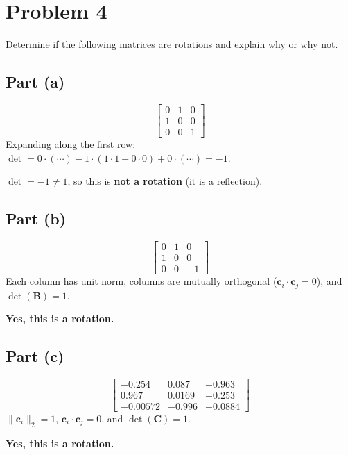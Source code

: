 \documentclass[11pt]{article}
\begin{document}
\section*{Problem 4}

\begin{statement}
Determine if the following matrices are rotations and explain why or why not.
\end{statement}

\subsection*{Part (a)}
\[
    \begin{bmatrix}
        0 & 1 & 0 \\
        1 & 0 & 0 \\
        0 & 0 & 1
    \end{bmatrix}
\]
Expanding along the first row: $\det = 0\cdot(\cdots) - 1\cdot(1\cdot1-0\cdot0) + 0\cdot(\cdots) = -1$.
\begin{result}
$\det=-1\neq1$, so this is \textbf{not a rotation} (it is a reflection).
\end{result}

\subsection*{Part (b)}
\[
    \begin{bmatrix}
        0 & 1 & 0 \\
        1 & 0 & 0 \\
        0 & 0 & -1
    \end{bmatrix}
\]
Each column has unit norm, columns are mutually orthogonal ($\bm c_i\cdot\bm c_j=0$), and $\det(\bm B)=1$.
\begin{result}
\textbf{Yes, this is a rotation.}
\end{result}

\subsection*{Part (c)}
\[
    \begin{bmatrix}
        -0.254 & 0.087 & -0.963 \\
        0.967 & 0.0169 & -0.253 \\
        -0.00572 & -0.996 & -0.0884
    \end{bmatrix}
\]
$\lVert\bm c_i\rVert_2=1$, $\bm c_i\cdot\bm c_j=0$, and $\det(\bm C)=1$.
\begin{result}
\textbf{Yes, this is a rotation.}
\end{result}
\end{document}
